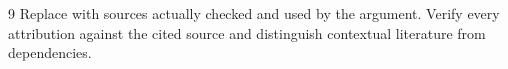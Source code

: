 \begin{thebibliography}{9}
Replace with sources actually checked and used by the argument. Verify every
attribution against the cited source and distinguish contextual literature from
dependencies.
\end{thebibliography}
